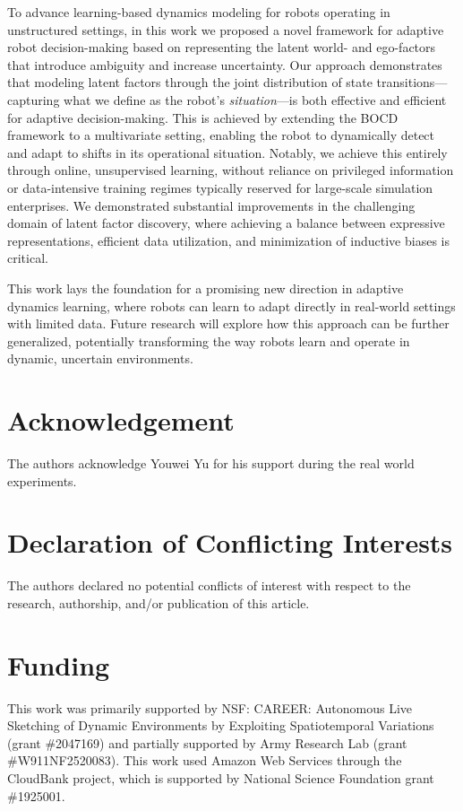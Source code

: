 \documentclass[Afour,sageh,times]{sagej}
\theoremstyle{lemma}
\begin{document}
To advance learning-based dynamics modeling for robots operating in unstructured settings, in this work we proposed a novel framework for adaptive robot decision-making based on representing the latent world- and ego-factors that introduce ambiguity and increase uncertainty. 
Our approach demonstrates that modeling latent factors through the joint distribution of state transitions—capturing what we define as the robot's \textit{situation}—is both effective and efficient for adaptive decision-making. This is achieved by extending the BOCD framework to a multivariate setting, enabling the robot to dynamically detect and adapt to shifts in its operational situation. Notably, we achieve this entirely through online, unsupervised learning, without reliance on privileged information or data-intensive training regimes typically reserved for large-scale simulation enterprises.
We demonstrated substantial improvements in 
the challenging domain of latent factor discovery, where achieving a balance between expressive representations, efficient data utilization, and minimization of inductive biases is critical.

This work lays the foundation for a promising new direction in adaptive dynamics learning, where robots can learn to adapt directly in real-world settings with limited data. Future research will explore how this approach can be further generalized, potentially transforming the way robots learn and operate in dynamic, uncertain environments.

\section{Acknowledgement}

The authors acknowledge Youwei Yu for his support during the real world experiments. 

\section{Declaration of Conflicting Interests}
The authors declared no potential conflicts of interest with
respect to the research, authorship, and/or publication of this
article. 

\section{Funding}
This work was primarily supported by NSF: CAREER: Autonomous Live Sketching of Dynamic Environments by Exploiting Spatiotemporal Variations (grant \#2047169) and partially supported by Army Research Lab (grant \#W911NF2520083). This work used Amazon Web Services through the CloudBank project, which is supported by National Science Foundation grant \#1925001.
\end{document}
